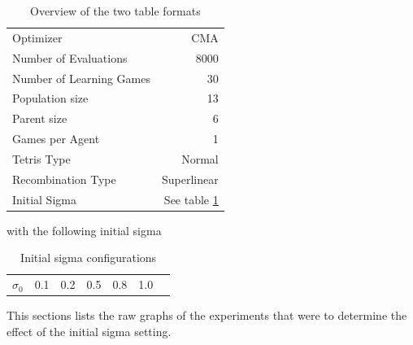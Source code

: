 \begin{table}[h]
\centering
\caption{Overview of the two table formats}
\begin{tabular}{l r}
Optimizer & CMA\\
Number of Evaluations & 8000\\
Number of Learning Games &30\\
Population size& 13\\
Parent size & 6\\
Games per Agent & 1\\
Tetris Type & Normal\\
\hline
Recombination Type & Superlinear\\
Initial Sigma & See table \ref{InitialSigmaTest}
\end{tabular}
\end{table}

with the following initial sigma

\begin{table}[H]
\centering
\begin{tabular}{c | c c c c c c}
$\sigma_0$ & 0.1 & 0.2 & 0.5 & 0.8 & 1.0
\end{tabular}
\caption{Initial sigma configurations \label{InitialSigmaTest}}
\end{table}
This sections lists the raw graphs of the experiments that were
to determine the effect of the initial sigma setting. 

